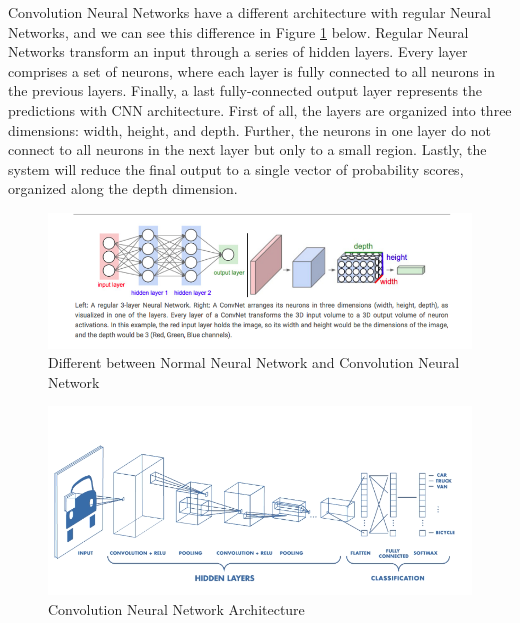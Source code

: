 Convolution Neural Networks have a different architecture with regular Neural Networks, and we can see this difference in Figure \ref{fig:Chap3-DiffArchCNN_NNN} below. Regular Neural Networks transform an input through a series of hidden layers. Every layer comprises a set of neurons, where each layer is fully connected to all neurons in the previous layers. Finally, a last fully-connected output layer represents the predictions with CNN architecture. First of all, the layers are organized into three dimensions: width, height, and depth. Further, the neurons in one layer do not connect to all neurons in the next layer but only to a small region. Lastly, the system will reduce the final output to a single vector of probability scores, organized along the depth dimension.

\begin{figure}[H]
	\centering
	\includegraphics[width=\textwidth]{img/Chap3/DiffArchCNN-ANN}
	\caption{Different between Normal Neural Network and Convolution Neural Network}
	\label{fig:Chap3-DiffArchCNN_NNN}
\end{figure}

\begin{figure}[H]
	\centering
	\includegraphics[width=\textwidth]{img/Chap3/CNN-Arch}
	\caption{Convolution Neural Network Architecture}
	\label{fig:Chap3-CNN_Arch}
\end{figure}

